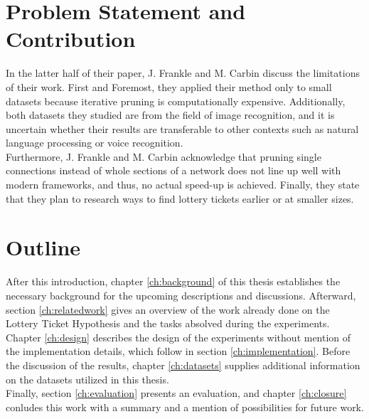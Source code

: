 \section{Problem Statement and Contribution}
In the latter half of their paper, J. Frankle and M. Carbin discuss the limitations of their work. First and Foremost, they applied their method only to small datasets because iterative pruning is computationally expensive.\cite{LTH} Additionally, both datasets they studied are from the field of image recognition, and it is uncertain whether their results are transferable to other contexts such as natural language processing or voice recognition.\\
Furthermore, J. Frankle and M. Carbin acknowledge that pruning single connections instead of whole sections of a network does not line up well with modern frameworks, and thus, no actual speed-up is achieved. Finally, they state that they plan to research ways to find lottery tickets earlier or at smaller sizes.\cite{LTH}


\section{Outline}

After this introduction, chapter \ref{ch:background} of this thesis establishes the necessary background for the upcoming descriptions and discussions. Afterward, section \ref{ch:relatedwork} gives an overview of the work already done on the Lottery Ticket Hypothesis and the tasks absolved during the experiments. Chapter \ref{ch:design} describes the design of the experiments without mention of the implementation details, which follow in section \ref{ch:implementation}. Before the discussion of the results, chapter \ref{ch:datasets} supplies additional information on the datasets utilized in this thesis.\\
Finally, section \ref{ch:evaluation} presents an evaluation, and chapter \ref{ch:closure} conludes this work with a summary and a mention of possibilities for future work.